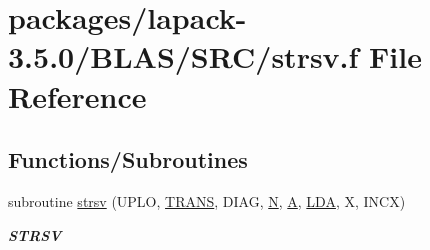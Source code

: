 \hypertarget{lapack-3_85_80_2BLAS_2SRC_2strsv_8f}{}\section{packages/lapack-\/3.5.0/\+B\+L\+A\+S/\+S\+R\+C/strsv.f File Reference}
\label{lapack-3_85_80_2BLAS_2SRC_2strsv_8f}
\subsection*{Functions/\+Subroutines}
\begin{DoxyCompactItemize}
\item 
subroutine \hyperlink{group__single__blas__level2_ga59aeaec580e854d68c43c47e951637fe}{strsv} (U\+P\+L\+O, \hyperlink{superlu__enum__consts_8h_a0c4e17b2d5cea33f9991ccc6a6678d62a1f61e3015bfe0f0c2c3fda4c5a0cdf58}{T\+R\+A\+N\+S}, D\+I\+A\+G, \hyperlink{polmisc_8c_a0240ac851181b84ac374872dc5434ee4}{N}, \hyperlink{classA}{A}, \hyperlink{example__user_8c_ae946da542ce0db94dced19b2ecefd1aa}{L\+D\+A}, X, I\+N\+C\+X)
\begin{DoxyCompactList}\small\item\em {\bfseries S\+T\+R\+S\+V} \end{DoxyCompactList}\end{DoxyCompactItemize}
